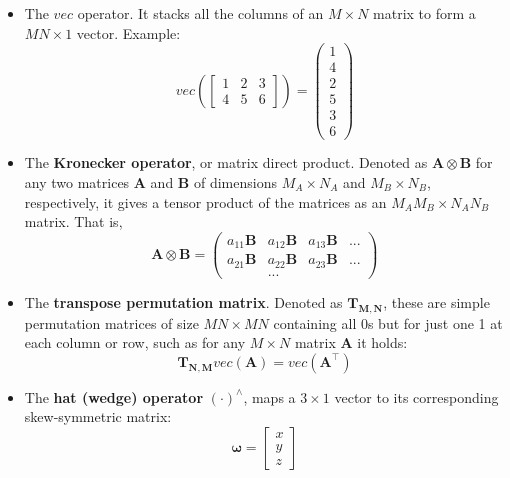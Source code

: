 \documentclass[a4paper,11pt]{report}
\begin{document}
\begin{itemize}
\item{The $vec$ operator. It stacks all the columns of an $M \times N$ matrix to form a $MN\times 1$ vector.
Example:
\begin{equation}
  vec\left( \left[
    \begin{array}{ccc}
      1 & 2 & 3 \\
      4 & 5 & 6
    \end{array}
 \right] \right) =
\left(
\begin{array}{c}
1 \\ 4 \\ 2 \\ 5 \\ 3 \\ 6
\end{array}
\right)
\end{equation}
}
\item{The \textbf{Kronecker operator}, or matrix direct product.
Denoted as $\mathbf{A} \otimes \mathbf{B}$ for any two matrices
$\mathbf{A}$ and $\mathbf{B}$ of dimensions $M_A \times N_A$
and $M_B \times N_B$, respectively,
it gives a tensor product of the matrices as an $M_AM_B \times N_A N_B$ matrix.
That is,
\begin{equation}
 \mathbf{A} \otimes \mathbf{B}
 =
\left(
\begin{array}{cccc}
a_{11} \mathbf{B}  & a_{12} \mathbf{B} & a_{13} \mathbf{B}  & ... \\
a_{21} \mathbf{B}  & a_{22} \mathbf{B} & a_{23} \mathbf{B}  & ... \\
 & ... &
\end{array}
\right)
\end{equation}
}
\item{The \textbf{transpose permutation matrix}. Denoted as $\mathbf{T_{M,N}}$,
these are simple permutation matrices of size $MN \times MN$ containing all 0s
but for just one 1 at each column or row,
such as for any $M \times N$ matrix $\mathbf{A}$ it holds:
\begin{equation}
\mathbf{T_{N,M}} vec(\mathbf{A}) = vec(\mathbf{A}^\top)
\end{equation}
}
\item{The \textbf{hat (wedge) operator} $(\cdot)^\wedge$, maps a $3\times 1$ vector to its corresponding skew-symmetric matrix:
	\begin{equation}
	\label{eq:skew}
	\bm{\omega} = \left[ \begin{array}{c} x \\ y \\z \end{array} \right]

\end{equation}}
\end{itemize}
\end{document}
